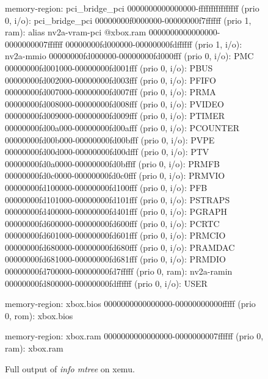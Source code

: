 \begin{figure}
\begin{minipage}{0.48\linewidth}
\begin{ffcode}
    memory-region: pci_bridge_pci
      0000000000000000-ffffffffffffffff (prio 0, i/o): pci_bridge_pci
        00000000f0000000-00000000f7ffffff (prio 1, ram): alias nv2a-vram-pci @xbox.ram 0000000000000000-0000000007ffffff
        00000000fd000000-00000000fdffffff (prio 1, i/o): nv2a-mmio
          00000000fd000000-00000000fd000fff (prio 0, i/o): PMC
          00000000fd001000-00000000fd001fff (prio 0, i/o): PBUS
          00000000fd002000-00000000fd003fff (prio 0, i/o): PFIFO
          00000000fd007000-00000000fd007fff (prio 0, i/o): PRMA
          00000000fd008000-00000000fd008fff (prio 0, i/o): PVIDEO
          00000000fd009000-00000000fd009fff (prio 0, i/o): PTIMER
          00000000fd00a000-00000000fd00afff (prio 0, i/o): PCOUNTER
          00000000fd00b000-00000000fd00bfff (prio 0, i/o): PVPE
          00000000fd00d000-00000000fd00dfff (prio 0, i/o): PTV
          00000000fd0a0000-00000000fd0bffff (prio 0, i/o): PRMFB
          00000000fd0c0000-00000000fd0c0fff (prio 0, i/o): PRMVIO
          00000000fd100000-00000000fd100fff (prio 0, i/o): PFB
          00000000fd101000-00000000fd101fff (prio 0, i/o): PSTRAPS
          00000000fd400000-00000000fd401fff (prio 0, i/o): PGRAPH
          00000000fd600000-00000000fd600fff (prio 0, i/o): PCRTC
          00000000fd601000-00000000fd601fff (prio 0, i/o): PRMCIO
          00000000fd680000-00000000fd680fff (prio 0, i/o): PRAMDAC
          00000000fd681000-00000000fd681fff (prio 0, i/o): PRMDIO
          00000000fd700000-00000000fd7fffff (prio 0, ram): nv2a-ramin
          00000000fd800000-00000000fdffffff (prio 0, i/o): USER

    memory-region: xbox.bios
      0000000000000000-00000000000fffff (prio 0, rom): xbox.bios

    memory-region: xbox.ram
      0000000000000000-0000000007ffffff (prio 0, ram): xbox.ram
    \end{ffcode}
  \end{minipage}
  \caption{Full output of \emph{info mtree} on xemu\cite{xemu}.}
  \label{fig:xemu_full}
\end{figure}

\restoregeometry

